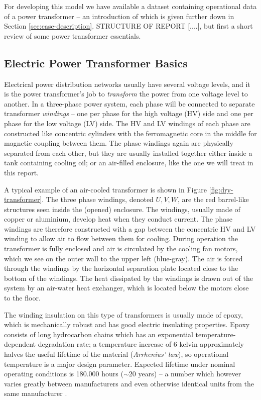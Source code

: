 \documentclass[]{article}
\begin{document}
For developing this model we have available a dataset containing operational data of a power transformer -- an introduction of which is given further down in Section \ref{sec:case-description}. STRUCTURE OF REPORT [....], but first a short review of some power transformer essentials.


\subsection{Electric Power Transformer Basics} \label{sec:transformers}
Electrical power distribution networks usually have several voltage levels, and it is the power transformer's job to \textit{transform} the power from one voltage level to another. In a three-phase power system, each phase will be connected to separate transformer \textit{windings} -- one per phase for the high voltage (HV) side and one per phase for the low voltage (LV) side. The HV and LV windings of each phase are constructed like concentric cylinders with the ferromagnetic core in the middle for magnetic coupling between them. The phase windings again are physically separated from each other, but they are usually installed together either inside a tank containing cooling oil; or an air-filled enclosure, like the one we will treat in this report. 

A typical example of an air-cooled transformer is shown in Figure \ref{fig:dry-transformer}. The three phase windings, denoted $U, V, W$, are the red barrel-like structures seen inside the (opened) enclosure. The windings, usually made of copper or aluminium, develop heat when they conduct current. The phase windings are therefore constructed with a gap between the concentric HV and LV winding to allow air to flow between them for cooling. During operation the transformer is fully enclosed and air is circulated by the cooling fan motors, which we see on the outer wall to the upper left (blue-gray). The air is forced through the windings by the horizontal separation plate located close to the bottom of the windings. The heat dissipated by the windings is drawn out of the system by an air-water heat exchanger, which is located below the motors close to the floor. 

The winding insulation on this type of transformers is usually made of epoxy, which is mechanically robust and has good electric insulating properties. Epoxy consists of long hydrocarbon chains which has an exponential temperature-dependent degradation rate; a temperature increase of 6 kelvin approximately halves the useful lifetime of the material (\textit{Arrhenius' law}), so operational temperature is a major design parameter. Expected lifetime under nominal operating conditions is 180.000 hours ($\sim 20$ years) -- a number which however varies greatly between manufacturers and even otherwise identical units from the same manufacturer \cite{iec60076-12}.
\end{document}
